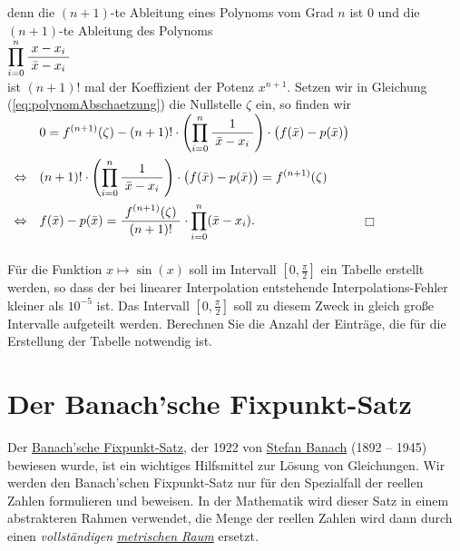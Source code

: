 denn die $(n+1)$-te Ableitung eines Polynoms vom Grad $n$ ist $0$ und die $(n+1)$-te
Ableitung des Polynoms 
\\[0.2cm]
\hspace*{1.3cm} $\displaystyle\prod\limits_{i=0}^{n} \displaystyle\frac{\;\displaystyle x-x_i\;}{\;\displaystyle\bar{x}-x_i\;}$ 
\\[0.2cm]
ist $(n+1)!$ mal der Koeffizient der Potenz $x^{n+1}$.  Setzen
wir in Gleichung (\ref{eq:polynomAbschaetzung}) die Nullstelle $\zeta$ ein, so finden wir 
\\[0.2cm]
\hspace*{1.3cm}
$
\begin{array}[b]{ll}
                & 0 = \displaystyle f^{(n+1)}(\zeta) - (n+1)!\cdot  \left(\prod\limits_{i=0}^{n} \displaystyle\frac{\;\displaystyle1\;}{\;\displaystyle\bar{x} - x_i\;}\right)\cdot  \bigl(f(\bar{x}) - p(\bar{x})\bigr) \\[0.5cm]
\Leftrightarrow & \displaystyle (n+1)!\cdot  \left(\prod\limits_{i=0}^{n} \displaystyle\frac{\;\displaystyle1\;}{\;\displaystyle\bar{x} - x_i\;}\right)\cdot  \bigl(f(\bar{x}) - p(\bar{x})\bigr) =  f^{(n+1)}(\zeta) \\[0.5cm]
\Leftrightarrow & \displaystyle f(\bar{x}) - p(\bar{x}) =  \displaystyle\frac{\;\displaystyle f^{(n+1)}(\zeta)\;}{\;\displaystyle(n+1)!\;} \cdot  \prod\limits_{i=0}^{n} (\bar{x} - x_i).\\[0.5cm]
\end{array}
$ \hspace*{\fill} $\Box$

\exercise
F\"ur die Funktion $x \mapsto \sin(x)$ soll im Intervall
$[0,\frac{\pi}{2}]$ ein Tabelle erstellt werden, so dass der bei linearer Interpolation entstehende
Interpolations-Fehler kleiner als $10^{-5}$ ist.  Das Intervall $[0,\frac{\pi}{2}]$ soll zu diesem
Zweck in gleich gro{\ss}e Intervalle aufgeteilt werden.  Berechnen Sie die Anzahl der
Eintr\"age, die f\"ur die Erstellung der Tabelle notwendig ist. \eox


\section{Der Banach'sche Fixpunkt-Satz}
Der \href{http://de.wikipedia.org/wiki/Banachscher_Fixpunktsatz}{Banach'sche Fixpunkt-Satz}, der 1922 von 
\href{http://en.wikipedia.org/wiki/Stefan_Banach}{Stefan Banach} (1892 -- 1945) bewiesen wurde, ist ein
wichtiges Hilfsmittel zur L\"osung von Gleichungen.  Wir werden den Banach'schen
Fixpunkt-Satz nur f\"ur den Spezialfall der reellen Zahlen formulieren und beweisen.
In der Mathematik wird dieser Satz in einem abstrakteren Rahmen verwendet, die Menge der
reellen Zahlen wird dann durch einen \emph{vollst\"andigen}
\href{http://de.wikipedia.org/wiki/Metrischer_Raum}{\emph{metrischen Raum}} ersetzt.

